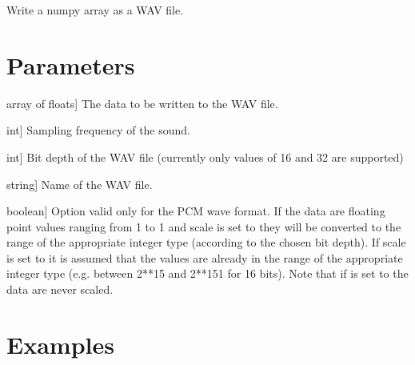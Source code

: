 \documentclass[letterpaper,10pt,english]{sphinxmanual}
\begin{document}
\begin{fulllineitems}
\label{\detokenize{intro:wavpy.wavwrite}}
\pysigstartsignatures
{}
\pysigstopsignatures
\sphinxAtStartPar
Write a numpy array as a WAV file.


\section{Parameters}
\label{\detokenize{intro:id3}}\begin{description}
\sphinxlineitem{data}{[}array of floats{]}
\sphinxAtStartPar
The data to be written to the WAV file.

\sphinxlineitem{fs}{[}int{]}
\sphinxAtStartPar
Sampling frequency of the sound.

\sphinxlineitem{nbits}{[}int{]}
\sphinxAtStartPar
Bit depth of the WAV file (currently only values of 16 and 32 are supported)

\sphinxlineitem{fName}{[}string{]}
\sphinxAtStartPar
Name of the WAV file.

\sphinxlineitem{scale}{[}boolean{]}
\sphinxAtStartPar
Option valid only for the PCM wave format. If the data are floating point
values ranging from \sphinxhyphen{}1 to 1 and scale is set to  they will be converted
to the range of the appropriate integer type (according to the chosen bit depth).
If scale is set to  it is assumed that the values are already in the range
of the appropriate integer type (e.g. between \sphinxhyphen{}2**15 and 2**15\sphinxhyphen{}1 for 16 bits).
Note that if  is set to  the data are never scaled.

\end{description}


\section{Examples}
\label{\detokenize{intro:id4}}
\begin{sphinxVerbatim}[commandchars=\\\{\}]
   
\end{sphinxVerbatim}

\end{fulllineitems}
\end{document}
